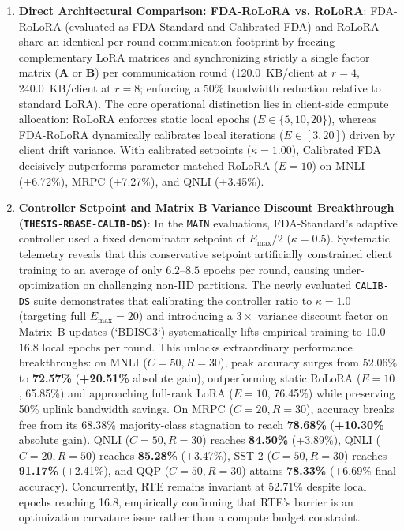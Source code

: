 \documentclass[10pt,a4paper]{article}
\begin{document}
\begin{enumerate}
    \item \textbf{Direct Architectural Comparison: FDA-RoLoRA vs. RoLoRA}: FDA-RoLoRA (evaluated as FDA-Standard and Calibrated FDA) and RoLoRA share an identical per-round communication footprint by freezing complementary LoRA matrices and synchronizing strictly a single factor matrix ($\mathbf{A}$ or $\mathbf{B}$) per communication round (120.0~KB/client at $r=4$, 240.0~KB/client at $r=8$; enforcing a 50\% bandwidth reduction relative to standard LoRA). The core operational distinction lies in client-side compute allocation: RoLoRA enforces static local epochs ($E \in \{5, 10, 20\}$), whereas FDA-RoLoRA dynamically calibrates local iterations ($E \in [3, 20]$) driven by client drift variance. With calibrated setpoints ($\kappa=1.00$), Calibrated FDA decisively outperforms parameter-matched RoLoRA ($E=10$) on MNLI (+6.72\%), MRPC (+7.27\%), and QNLI (+3.45\%).
    \item \textbf{Controller Setpoint and Matrix B Variance Discount Breakthrough (\texttt{THESIS-RBASE-CALIB-DS})}: In the \texttt{MAIN} evaluations, FDA-Standard's adaptive controller used a fixed denominator setpoint of $E_{\max}/2$ ($\kappa = 0.5$). Systematic telemetry reveals that this conservative setpoint artificially constrained client training to an average of only $6.2$--$8.5$ epochs per round, causing under-optimization on challenging non-IID partitions. The newly evaluated \texttt{CALIB-DS} suite demonstrates that calibrating the controller ratio to $\kappa = 1.0$ (targeting full $E_{\max} = 20$) and introducing a $3\times$ variance discount factor on Matrix~B updates (`BDISC3`) systematically lifts empirical training to $10.0$--$16.8$ local epochs per round. This unlocks extraordinary performance breakthroughs: on MNLI ($C=50, R=30$), peak accuracy surges from $52.06\%$ to \textbf{72.57\%} (\textbf{+20.51\%} absolute gain), outperforming static RoLoRA ($E=10$, 65.85\%) and approaching full-rank LoRA ($E=10$, 76.45\%) while preserving 50\% uplink bandwidth savings. On MRPC ($C=20, R=30$), accuracy breaks free from its 68.38\% majority-class stagnation to reach \textbf{78.68\%} (\textbf{+10.30\%} absolute gain). QNLI ($C=50, R=30$) reaches \textbf{84.50\%} (+3.89\%), QNLI ($C=20, R=50$) reaches \textbf{85.28\%} (+3.47\%), SST-2 ($C=50, R=30$) reaches \textbf{91.17\%} (+2.41\%), and QQP ($C=50, R=30$) attains \textbf{78.33\%} (+6.69\% final accuracy). Concurrently, RTE remains invariant at 52.71\% despite local epochs reaching 16.8, empirically confirming that RTE's barrier is an optimization curvature issue rather than a compute budget constraint.
\end{enumerate}
\end{document}

